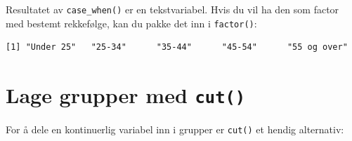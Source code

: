 \documentclass[
  norsk,
  letterpaper,
  DIV=11,
  numbers=noendperiod]{scrreprt}
\newenvironment{Shaded}{\begin{snugshade}}{\end{snugshade}}
\newcommand{\AttributeTok}[1]{\textcolor[rgb]{0.40,0.45,0.13}{#1}}
\newcommand{\DecValTok}[1]{\textcolor[rgb]{0.68,0.00,0.00}{#1}}
\newcommand{\FunctionTok}[1]{\textcolor[rgb]{0.28,0.35,0.67}{#1}}
\newcommand{\NormalTok}[1]{\textcolor[rgb]{0.00,0.23,0.31}{#1}}
\newcommand{\OtherTok}[1]{\textcolor[rgb]{0.00,0.23,0.31}{#1}}
\newcommand{\SpecialCharTok}[1]{\textcolor[rgb]{0.37,0.37,0.37}{#1}}
\newcommand{\StringTok}[1]{\textcolor[rgb]{0.13,0.47,0.30}{#1}}
\theoremstyle{definition}
\theoremstyle{remark}
\begin{document}
Resultatet av \texttt{case\_when()} er en tekstvariabel. Hvis du vil ha
den som factor med bestemt rekkefølge, kan du pakke det inn i
\texttt{factor()}:

\begin{Shaded}
\end{Shaded}

\begin{verbatim}
[1] "Under 25"   "25-34"      "35-44"      "45-54"      "55 og over"
\end{verbatim}

\section{\texorpdfstring{Lage grupper med
\texttt{cut()}}{Lage grupper med cut()}}\label{lage-grupper-med-cut}

For å dele en kontinuerlig variabel inn i grupper er \texttt{cut()} et
hendig alternativ:
\end{document}
